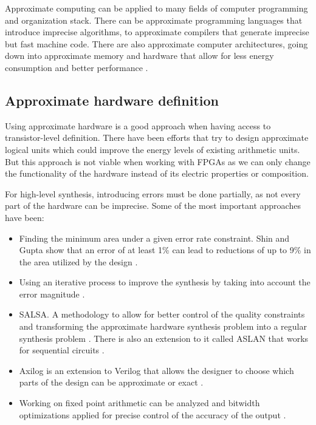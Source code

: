 Approximate computing can be applied to many fields of computer programming and organization stack.
There can be approximate programming languages that introduce imprecise algorithms, 
to approximate compilers that generate imprecise but fast machine code.
There are also approximate computer architectures, going down into approximate memory and hardware that allow for 
less energy consumption and better performance \cite{surveyqu}.

\subsection{Approximate hardware definition}

Using approximate hardware is a good approach when having access to transistor-level definition.
There have been efforts that try to design approximate logical units \cite{kim2013energy}\cite{ye2013reconfiguration}
which could improve the energy levels of existing arithmetic units. But this approach is 
not viable when working with FPGAs as we can only change the functionality of the hardware
instead of its electric properties or composition.

For high-level synthesis, introducing errors must be done partially, as not every
part of the hardware can be imprecise. Some of the most important approaches have been:

\begin{itemize}
  \item Finding the minimum area under a given error rate constraint. Shin and Gupta
  show that an error of at least 1\% can lead to reductions of up to 9\% in the area
  utilized by the design \cite{shin2010approximate}.
  \item Using an iterative process to improve the synthesis by taking into account
  the error magnitude \cite{miao2013approximate}.
  \item SALSA. A methodology to allow for better control of the quality constraints
  and transforming the approximate hardware synthesis problem into a regular synthesis
  problem \cite{venkataramani2012salsa}. There is also an extension to it called ASLAN
  that works for sequential circuits \cite{ranjan2014aslan}.
  \item Axilog is an extension to Verilog that allows the designer to choose which parts
  of the design can be approximate or exact \cite{yazdanbakhsh2015axilog}.
  \item Working on fixed point arithmetic can be analyzed and bitwidth optimizations
  applied for precise control of the accuracy of the output \cite{li2015joint}.
\end{itemize}

